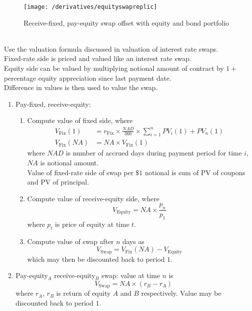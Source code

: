 \begin{figure}[H]
\centering
\texttt{[image: /derivatives/equityswapreplic]}
\caption{Receive-fixed, pay-equity swap offset with equity and bond portfolio}
\end{figure}

\begin{method} \\
Use the valuation formula discussed in valuation of interest rate swaps.\\
Fixed-rate side is priced and valued like an interest rate swap.\\
Equity side can be valued by multiplying notional amount of contract by $1 +$ percentage equity appreciation since last payment date.\\
Difference in values is then used to value the swap.
\end{method}

\begin{method} 
\begin{enumerate}[label=\roman*.]
\setlength{\itemsep}{0pt}
\item Pay-fixed, receive-equity:
\begin{enumerate}[label=\arabic*.]
\setlength{\itemsep}{0pt}
\item Compute value of fixed side, where
\begin{align}
V_{\text{Fix}}(1) &= r_{\text{Fix}} \times \frac{NAD}{360} \times \sum\limits_{i=1}^n PV_{i}(1) + PV_{n}(1) \nonumber \\
V_{\text{Fix}}(NA) &= NA \times V_\text{Fix}(1) \nonumber
\end{align}
where $NAD$ is number of accrued days during payment period for time $i$, $NA$ is notional amount.\\
Value of fixed-rate side of swap per $\$1$ notional is sum of PV of coupons and PV of principal.
\item Compute value of receive-equity side, where
\begin{equation}
V_{\text{Equity}} = NA \times \frac{p_n}{p_1} \nonumber
\end{equation}
where $p_t$ is price of equity at time $t$.
\item Compute value of swap after $n$ days as
\begin{equation}
V_{\text{Swap}} = V_{\text{Fix}}(NA) - V_{\text{Equity}} \nonumber
\end{equation}
which may then be discounted back to period $1$.
\end{enumerate}
\item Pay-equity$_A$ receive-equity$_B$ swap: value at time $n$ is
\begin{equation}
V_{\text{Swap}} = NA \times (r_B - r_A) \nonumber
\end{equation}
where $r_A$, $r_B$ is return of equity $A$ and $B$ respectively. Value may be discounted back to period $1$.
\end{enumerate}
\end{method}

